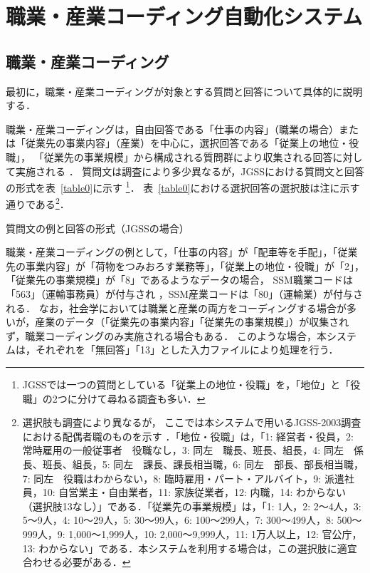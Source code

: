 \documentclass[japanese]{jnlp_1.4}
\begin{document}
\section{職業・産業コーディング自動化システム} 

\subsection{職業・産業コーディング}

最初に，職業・産業コーディングが対象とする質問と回答について具体的に説明する．

職業・産業コーディングは，自由回答である「仕事の内容」（職業の場合）または「従業先の事業内容」（産業）を中心に，選択回答である「従業上の地位・役職」， 「従業先の事業規模」から構成される質問群により収集される回答に対して実施される \cite{SSM96}． 
質問文は調査により多少異なるが，JGSSにおける質問文と回答の形式を表~\ref{table0}に示す \cite{JGSS05}\footnote{JGSSでは一つの質問としている「従業上の地位・役職」を，「地位」と「役職」の2つに分けて尋ねる調査も多い．}．
表~\ref{table0}における選択回答の選択肢は注に示す通りである\footnote{選択肢も調査により異なるが， ここでは本システムで用いるJGSS-2003調査における配偶者職のものを示す \cite{JGSS05}．「地位・役職」は，「1: 経営者・役員，2: 常時雇用の一般従事者　役職なし，3: 同左　職長、班長、組長，4: 同左　係長、班長、組長，5: 同左　課長、課長相当職，6: 同左　部長、部長相当職，7: 同左　役職はわからない，8: 臨時雇用・パート・アルバイト，9: 派遣社員，10: 自営業主・自由業者，11: 家族従業者，12: 内職，14: わからない（選択肢13なし）」である．「従業先の事業規模」は，「1: 1人，2: 2〜4人，3: 5〜9人，4: 10〜29人，5: 30〜99人，6: 100〜299人，7: 300〜499人，8: 500〜999人，9: 1,000〜1,999人，10: 2,000〜9,999人，11: 1万人以上，12: 官公庁，13: わからない」である．本システムを利用する場合は，この選択肢に適宜合わせる必要がある．}．

\begin{table}[t]
\caption{質問文の例と回答の形式（JGSSの場合）}
\label{table0}

\end{table}

職業・産業コーディングの例として，「仕事の内容」が「配車等を手配」，「従業先の事業内容」が「荷物をつみおろす業務等」，「従業上の地位・役職」が「2」，「従業先の事業規模」が「8」であるようなデータの場合，
SSM職業コードは「563」（運輸事務員）が付与され \cite{Takahashi_et_al05c}，SSM産業コードは「80」（運輸業）が付与される．
なお，社会学においては職業と産業の両方をコーディングする場合が多いが，産業のデータ（「従業先の事業内容」「従業先の事業規模」）が収集されず，職業コーディングのみ実施される場合もある． 
このような場合，本システムは，それぞれを「無回答」「13」とした入力ファイルにより処理を行う．
 
\end{document}
